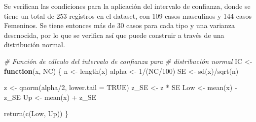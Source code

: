 \documentclass[
]{article}
\newenvironment{Shaded}{\begin{snugshade}}{\end{snugshade}}
\newcommand{\AttributeTok}[1]{\textcolor[rgb]{0.77,0.63,0.00}{#1}}
\newcommand{\CommentTok}[1]{\textcolor[rgb]{0.56,0.35,0.01}{\textit{#1}}}
\newcommand{\ConstantTok}[1]{\textcolor[rgb]{0.00,0.00,0.00}{#1}}
\newcommand{\ControlFlowTok}[1]{\textcolor[rgb]{0.13,0.29,0.53}{\textbf{#1}}}
\newcommand{\DecValTok}[1]{\textcolor[rgb]{0.00,0.00,0.81}{#1}}
\newcommand{\FunctionTok}[1]{\textcolor[rgb]{0.00,0.00,0.00}{#1}}
\newcommand{\NormalTok}[1]{#1}
\newcommand{\OtherTok}[1]{\textcolor[rgb]{0.56,0.35,0.01}{#1}}
\newcommand{\SpecialCharTok}[1]{\textcolor[rgb]{0.00,0.00,0.00}{#1}}
\newcommand{\StringTok}[1]{\textcolor[rgb]{0.31,0.60,0.02}{#1}}
\begin{document}
\vspace{0.3cm}

Se verifican las condiciones para la aplicación del intervalo de
confianza, donde se tiene un total de 253 registros en el dataset, con
109 casos masculinos y 144 casos Femeninos. Se tiene entonces más de 30
casos para cada tipo y una varianza descnocida, por lo que se verifica
así que puede construir a través de una distribución normal.

\vspace{0.3cm}

\begin{Shaded}
\begin{Highlighting}[]
\CommentTok{\# Función de cálculo del intervalo de confianza para}
\CommentTok{\# distribución normal}
\NormalTok{IC }\OtherTok{\textless{}{-}} \ControlFlowTok{function}\NormalTok{(x, NC) \{}
\NormalTok{    n }\OtherTok{\textless{}{-}} \FunctionTok{length}\NormalTok{(x)}
\NormalTok{    alpha }\OtherTok{\textless{}{-}} \DecValTok{1}\SpecialCharTok{/}\NormalTok{(NC}\SpecialCharTok{/}\DecValTok{100}\NormalTok{)}
\NormalTok{    SE }\OtherTok{\textless{}{-}} \FunctionTok{sd}\NormalTok{(x)}\SpecialCharTok{/}\FunctionTok{sqrt}\NormalTok{(n)}

\NormalTok{    z }\OtherTok{\textless{}{-}} \FunctionTok{qnorm}\NormalTok{(alpha}\SpecialCharTok{/}\DecValTok{2}\NormalTok{, }\AttributeTok{lower.tail =} \ConstantTok{TRUE}\NormalTok{)}
\NormalTok{    z\_SE }\OtherTok{\textless{}{-}}\NormalTok{ z }\SpecialCharTok{*}\NormalTok{ SE}
\NormalTok{    Low }\OtherTok{\textless{}{-}} \FunctionTok{mean}\NormalTok{(x) }\SpecialCharTok{{-}}\NormalTok{ z\_SE}
\NormalTok{    Up }\OtherTok{\textless{}{-}} \FunctionTok{mean}\NormalTok{(x) }\SpecialCharTok{+}\NormalTok{ z\_SE}

    \FunctionTok{return}\NormalTok{(}\FunctionTok{c}\NormalTok{(Low, Up))}
\NormalTok{\}}
\end{Highlighting}
\end{Shaded}

\vspace{0.3cm}

\begin{Shaded}
\end{Shaded}
\end{document}
